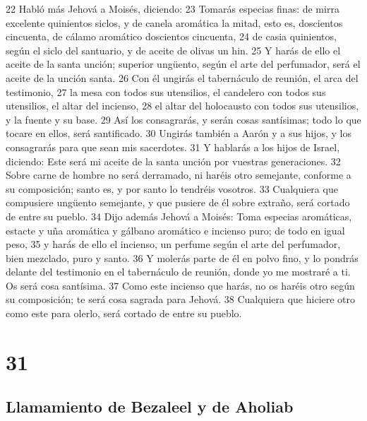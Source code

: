 22 Habló más Jehová a Moisés, diciendo:
23 Tomarás especias finas: de mirra excelente quinientos siclos,  y de canela aromática la mitad, esto es, doscientos cincuenta, de cálamo aromático doscientos cincuenta,
24 de casia quinientos, según el siclo del santuario, y de aceite de olivas un hin.
25 Y harás de ello el aceite de la santa unción; superior ungüento, según el arte del perfumador, será el aceite de la unción santa.
26 Con él ungirás el tabernáculo de reunión, el arca del testimonio,
27 la mesa con todos sus utensilios, el candelero con todos sus utensilios, el altar del incienso,
28 el altar del holocausto con todos sus utensilios, y la fuente y su base.
29 Así los consagrarás, y serán cosas santísimas; todo lo que tocare en ellos, será santificado.
30 Ungirás también a Aarón y a sus hijos, y los consagrarás para que sean mis sacerdotes.
31 Y hablarás a los hijos de Israel, diciendo: Este será mi aceite de la santa unción por vuestras generaciones.
32 Sobre carne de hombre no será derramado, ni haréis otro semejante, conforme a su composición; santo es, y por santo lo tendréis vosotros.
33 Cualquiera que compusiere ungüento semejante, y que pusiere de él sobre extraño, será cortado de entre su pueblo.
34 Dijo además Jehová a Moisés: Toma especias aromáticas, estacte y uña aromática y gálbano aromático e incienso puro; de todo en igual peso,
35 y harás de ello el incienso, un perfume según el arte del perfumador, bien mezclado, puro y santo.
36 Y molerás parte de él en polvo fino, y lo pondrás delante del testimonio en el tabernáculo de reunión, donde yo me mostraré a ti. Os será cosa santísima.
37 Como este incienso que harás, no os haréis otro según su composición; te será cosa sagrada para Jehová.
38 Cualquiera que hiciere otro como este para olerlo, será cortado de entre su pueblo.

\chapter{31}

\section*{Llamamiento de Bezaleel y de Aholiab}

